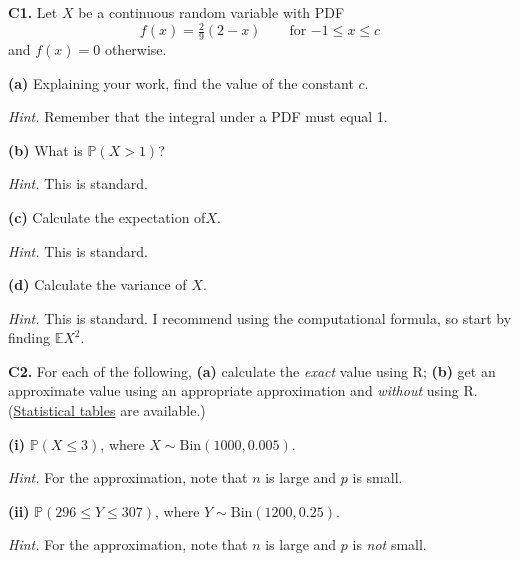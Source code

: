 \documentclass[
  a4paper,
]{book}
\theoremstyle{definition}
\theoremstyle{definition}
\theoremstyle{definition}
\theoremstyle{definition}
\theoremstyle{remark}
\begin{document}
\textbf{C1.} Let \(X\) be a continuous random variable with PDF
\[ f(x) = \tfrac29 (2 - x) \qquad \text{for $-1 \leq x \leq c$} \]
and \(f(x) = 0\) otherwise.

\textbf{(a)} Explaining your work, find the value of the constant \(c\).

\begin{myanswers}
\emph{Hint.} Remember that the integral under a PDF must equal 1.

\end{myanswers}

\textbf{(b)}
What is \(\mathbb P(X > 1)\)?

\begin{myanswers}
\emph{Hint.} This is standard.

\end{myanswers}

\textbf{(c)} Calculate the expectation of\(X\).

\begin{myanswers}
\emph{Hint.} This is standard.

\end{myanswers}

\textbf{(d)} Calculate the variance of \(X\).

\begin{myanswers}
\emph{Hint.} This is standard. I recommend using the computational formula, so start by finding \(\mathbb EX^2\).

\end{myanswers}

\textbf{C2.} For each of the following, \textbf{(a)} calculate the \emph{exact} value using R; \textbf{(b)} get an approximate value using an appropriate approximation and \emph{without} using R. (\href{https://mpaldridge.github.io/math1710/stat-tab.pdf}{Statistical tables} are available.)

\textbf{(i)} \(\mathbb P(X \leq 3)\), where \(X \sim \mathrm{Bin}(1000, 0.005)\).

\begin{myanswers}
\emph{Hint.} For the approximation, note that \(n\) is large and \(p\) is small.

\end{myanswers}

\textbf{(ii)} \(\mathbb P(296 \leq Y \leq 307)\), where \(Y \sim \mathrm{Bin}(1200, 0.25)\).

\begin{myanswers}
\emph{Hint.} For the approximation, note that \(n\) is large and \(p\) is \emph{not} small.

\end{myanswers}
\end{document}

